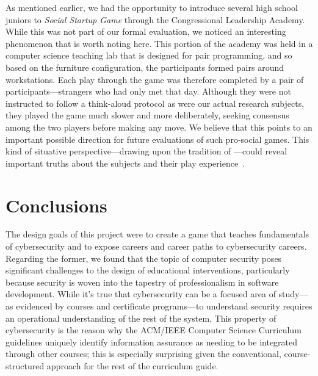 \documentclass[letterpaper]{article}
\begin{document}
As mentioned earlier, we had the opportunity to introduce several
high school juniors to \textit{Social Startup Game} through the 
Congressional Leadership Academy. While this was not part of our
formal evaluation, we noticed an interesting phenomenon that is worth
noting here. This portion of the academy was held in a computer science
teaching lab that is designed for pair programming, and so based on
the furniture configuration, the participants formed pairs around
workstations. Each play through the game was therefore completed
by a pair of participants---strangers who had only met that day.
Although they were not instructed to follow a think-aloud protocol
as were our actual research subjects, they played the game much
slower and more deliberately, seeking consensus among the two players
before making any move. We believe that this points to an important
possible direction for future evaluations of such pro-social games.
This kind of situative perspective---drawing upon the tradition
of \citet{Wenger1999}---could reveal important truths
about the subjects and their play experience~\citep{Hickey2003}.


\section{Conclusions}

The design goals of this project were to create a game that teaches
fundamentals of cybersecurity and to expose careers and career paths
to cybersecurity careers.
Regarding the former, we found that the topic of 
computer security poses significant challenges to the design of
educational interventions, particularly because security is woven
into the tapestry of professionalism in software development.
While it's true that cybersecurity can be a focused area of study---as
evidenced by courses and certificate programs---to understand security
requires an operational understanding of the rest of the system.
This property of cybersecurity is the reason why the ACM/IEEE Computer Science
Curriculum guidelines uniquely identify information assurance as needing
to be integrated through other courses; this is especially surprising given
the conventional, course-structured approach for the rest of the curriculum
guide.
\end{document}
